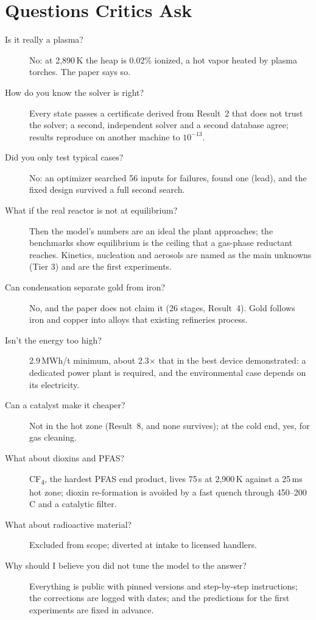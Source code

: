 \documentclass[11pt,a4paper]{article}
\begin{document}
\section{Questions Critics Ask}
\begin{description}
\item[Is it really a plasma?] No: at 2,890\,K the heap is 0.02\% ionized, a hot vapor heated by plasma torches. The paper says so.
\item[How do you know the solver is right?] Every state passes a certificate derived from Result~2 that does not trust the solver; a second, independent solver and a second database agree; results reproduce on another machine to $10^{-13}$.
\item[Did you only test typical cases?] No: an optimizer searched 56 inputs for failures, found one (lead), and the fixed design survived a full second search.
\item[What if the real reactor is not at equilibrium?] Then the model's numbers are an ideal the plant approaches; the benchmarks show equilibrium is the ceiling that a gas-phase reductant reaches. Kinetics, nucleation and aerosols are named as the main unknowns (Tier 3) and are the first experiments.
\item[Can condensation separate gold from iron?] No, and the paper does not claim it (26 stages, Result~4). Gold follows iron and copper into alloys that existing refineries process.
\item[Isn't the energy too high?] 2.9\,MWh/t minimum, about 2.3$\times$ that in the best device demonstrated: a dedicated power plant is required, and the environmental case depends on its electricity.
\item[Can a catalyst make it cheaper?] Not in the hot zone (Result~8, and none survives); at the cold end, yes, for gas cleaning.
\item[What about dioxins and PFAS?] CF\textsubscript{4}, the hardest PFAS end product, lives 75\,\textmu s at 2,900\,K against a 25\,ms hot zone; dioxin re-formation is avoided by a fast quench through 450--200\,\textdegree C and a catalytic filter.
\item[What about radioactive material?] Excluded from scope; diverted at intake to licensed handlers.
\item[Why should I believe you did not tune the model to the answer?] Everything is public with pinned versions and step-by-step instructions; the corrections are logged with dates; and the predictions for the first experiments are fixed in advance.
\end{description}
\end{document}
